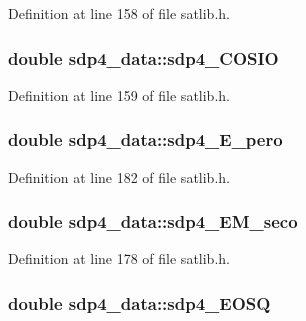 Definition at line 158 of file satlib.\-h.

\hypertarget{structsdp4__data_ad15763f5ab1823c9ce28f4200ee4015d}{
\subsubsection[{sdp4\-\_\-\-C\-O\-S\-I\-O}]{\setlength{\rightskip}{0pt plus 5cm}double sdp4\-\_\-data\-::sdp4\-\_\-\-C\-O\-S\-I\-O}}\label{structsdp4__data_ad15763f5ab1823c9ce28f4200ee4015d}


Definition at line 159 of file satlib.\-h.

\hypertarget{structsdp4__data_a931df30aad000edfe6d749a7f973b72f}{
\subsubsection[{sdp4\-\_\-\-E\-\_\-pero}]{\setlength{\rightskip}{0pt plus 5cm}double sdp4\-\_\-data\-::sdp4\-\_\-\-E\-\_\-pero}}\label{structsdp4__data_a931df30aad000edfe6d749a7f973b72f}


Definition at line 182 of file satlib.\-h.

\hypertarget{structsdp4__data_a190d3f5e55a0d373252664f5733532c9}{
\subsubsection[{sdp4\-\_\-\-E\-M\-\_\-seco}]{\setlength{\rightskip}{0pt plus 5cm}double sdp4\-\_\-data\-::sdp4\-\_\-\-E\-M\-\_\-seco}}\label{structsdp4__data_a190d3f5e55a0d373252664f5733532c9}


Definition at line 178 of file satlib.\-h.

\hypertarget{structsdp4__data_aec407c0dbe694c85a247151032b1bf75}{
\subsubsection[{sdp4\-\_\-\-E\-O\-S\-Q}]{\setlength{\rightskip}{0pt plus 5cm}double sdp4\-\_\-data\-::sdp4\-\_\-\-E\-O\-S\-Q}}\label{structsdp4__data_aec407c0dbe694c85a247151032b1bf75}


